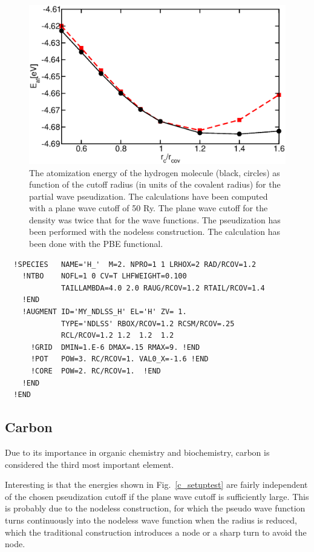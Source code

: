\documentclass[11pt,a4paper]{report}
\begin{document}
\begin{figure}[h!]
\begin{center}
\includegraphics[width=0.5\linewidth,clip=true]
{Figs/H_setuptest/eofrc.eps}
\end{center}
\caption{\label{h2_setuptest}The atomization energy of the hydrogen
  molecule (black, circles) as function of the cutoff radius (in units
  of the covalent radius) for the partial wave pseudization.  The
  calculations have been computed with a plane wave cutoff of 50
  Ry. The plane wave cutoff for the density was twice that for the
  wave functions. The pseudization has been performed with the
  nodeless construction. The calculation has been done with the PBE
  functional.}
\end{figure}

\begin{verbatim}
  !SPECIES   NAME='H_'  M=2. NPRO=1 1 LRHOX=2 RAD/RCOV=1.2
    !NTBO    NOFL=1 0 CV=T LHFWEIGHT=0.100
             TAILLAMBDA=4.0 2.0 RAUG/RCOV=1.2 RTAIL/RCOV=1.4 
    !END 
    !AUGMENT ID='MY_NDLSS_H' EL='H' ZV= 1.
             TYPE='NDLSS' RBOX/RCOV=1.2 RCSM/RCOV=.25
             RCL/RCOV=1.2 1.2  1.2  1.2 
      !GRID  DMIN=1.E-6 DMAX=.15 RMAX=9. !END
      !POT   POW=3. RC/RCOV=1. VAL0_X=-1.6 !END
      !CORE  POW=2. RC/RCOV=1.  !END
    !END
  !END
\end{verbatim}

\subsection{Carbon}
Due to its importance in organic chemistry and biochemistry, carbon is
considered the third most important element.

Interesting is that the energies shown in Fig.~\ref{c_setuptest} are
fairly independent of the chosen pseudization cutoff if the plane wave
cutoff is sufficiently large. This is probably due to the nodeless
construction, for which the pseudo wave function turns continuously
into the nodeless wave function when the radius is reduced, which the
traditional construction introduces a node or a sharp turn to avoid
the node.
\end{document}
